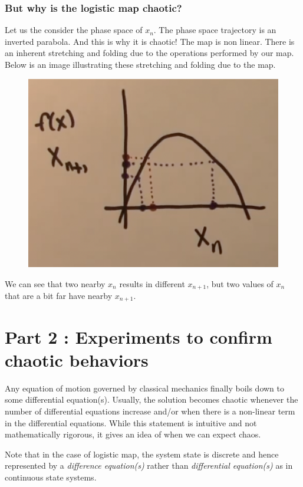 \documentclass{article}
\begin{document}
\subsubsection*{But why is the logistic map chaotic?}
Let us the consider the phase space of $x_n$. The phase space trajectory is an inverted parabola. And this is why it is chaotic! The map is non linear. There is an inherent stretching and folding due to the operations performed by our map. Below is an image illustrating these stretching and folding due to the map. 
\begin{figure}[h]
    \centering{}
    \includegraphics[scale = 0.45]{stretchfold}
\end{figure}
We can see that two nearby $x_n$ results in different $x_{n+1}$, but two values of $x_n$ that are a bit far have nearby $x_{n+1}$.
\section*{Part 2 : Experiments to confirm chaotic behaviors}
Any equation of motion governed by classical mechanics finally boils down to some differential equation(s). Usually, the solution becomes chaotic whenever the number of differential equations increase and/or when there is a non-linear term in the differential equations. While this statement is intuitive and not mathematically rigorous, it gives an idea of when we can expect chaos. 

Note that in the case of logistic map, the system state is discrete and hence represented by a \emph{difference equation(s)} rather than \emph{differential equation(s)} as in continuous state systems.
\end{document}
